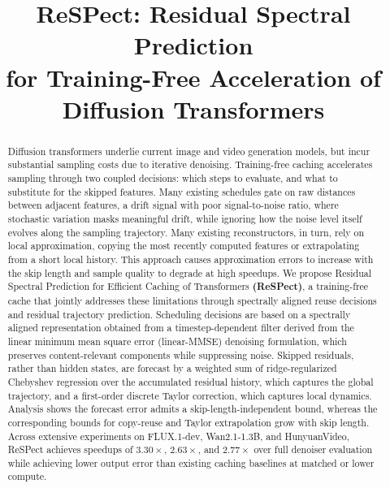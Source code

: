 \documentclass{article} %
\title{ReSPect: Residual Spectral Prediction\\for Training-Free Acceleration of Diffusion Transformers}
\begin{document}
\maketitle

\begin{abstract}
Diffusion transformers underlie current image and video generation models, but incur substantial sampling costs due to iterative denoising.
Training-free caching accelerates sampling through two coupled decisions: which steps to evaluate, and what to substitute for the skipped features. Many existing schedules gate on raw distances between adjacent features, a drift signal with poor signal-to-noise ratio, where stochastic variation masks meaningful drift, while ignoring how the noise level itself evolves along the sampling trajectory. Many existing reconstructors, in turn, rely on local approximation, copying the most recently computed features or extrapolating from a short local history. This approach causes approximation errors to increase with the skip length and sample quality to degrade at high speedups. We propose Residual Spectral Prediction for Efficient Caching of Transformers \textbf{(ReSPect)}, a training-free cache that jointly addresses these limitations through spectrally aligned reuse decisions and residual trajectory prediction. Scheduling decisions are based on a spectrally aligned representation obtained from a timestep-dependent filter derived from the linear minimum mean square error (linear-MMSE) denoising formulation, which preserves content-relevant components while suppressing noise. Skipped residuals, rather than hidden states, are forecast by a weighted sum of ridge-regularized Chebyshev regression over the accumulated residual history, which captures the global trajectory, and a first-order discrete Taylor correction, which captures local dynamics. Analysis shows the forecast error admits a skip-length-independent bound, whereas the corresponding bounds for copy-reuse and Taylor extrapolation grow with skip length. Across extensive experiments on FLUX.1-dev, Wan2.1-1.3B, and HunyuanVideo, ReSPect achieves speedups of $3.30\times$, $2.63\times$, and $2.77\times$ over full denoiser evaluation while achieving lower output error than existing caching baselines at matched or lower compute.

\end{abstract}

\end{document}
